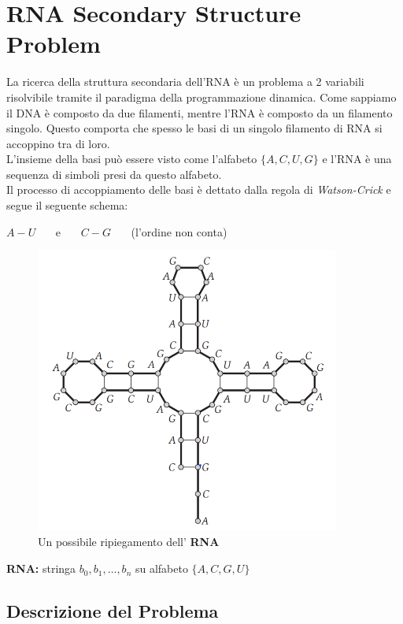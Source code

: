 \chapter{RNA Secondary Structure Problem}
\label{chap:rna}

La ricerca della struttura secondaria dell'RNA è un problema a 2
variabili risolvibile tramite il paradigma della programmazione
dinamica. Come sappiamo il DNA è composto da due filamenti, mentre l'RNA
è composto da un filamento singolo. Questo comporta che spesso le basi
di un singolo filamento di RNA si accoppino tra di loro.\\

L'insieme della basi può essere visto come l'alfabeto $\{A, C, U, G\}$
e l'RNA è una sequenza di simboli presi da questo alfabeto.\\

Il processo di accoppiamento delle basi è dettato dalla regola di
\emph{Watson-Crick} e segue il seguente schema:

\begin{center}
  $A-U$ \ \ \ e \ \ \ $C-G$ \ \ \ (l'ordine non conta)
\end{center}


\begin{figure}[H]
  \centering
  \includegraphics[width=10cm, keepaspectratio]{capitoli/programmazione_dinamica/imgs/rna1.png}
  \caption{Un possibile ripiegamento dell' \textbf{RNA}}
\end{figure}


\textbf{RNA:} stringa $b_0,b_1, \ldots, b_n$ su alfabeto $\{A, C, G, U\}$

\section{Descrizione del Problema}

